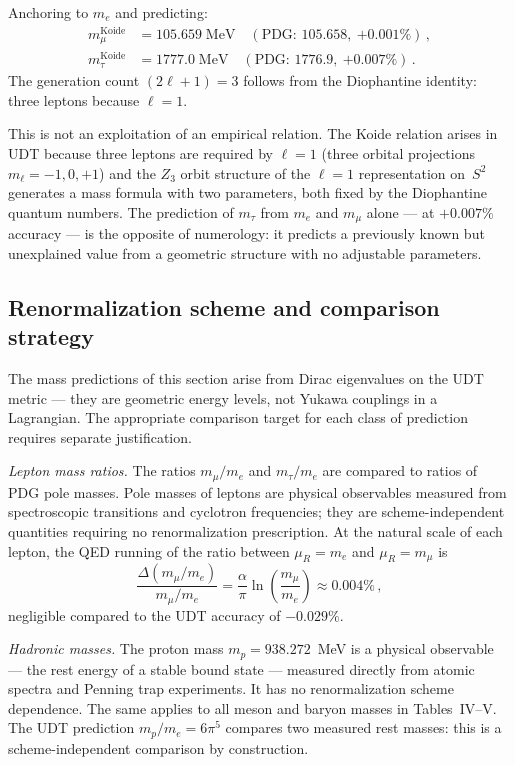 \documentclass[aps,prd,twocolumn,superscriptaddress,nofootinbib,longbibliography]{revtex4-2}
\begin{document}
Anchoring to $m_e$ and predicting:
\begin{align}
  m_\mu^{\mathrm{Koide}} &= 105.659\;\text{MeV}
    \quad(\text{PDG: }105.658,\ {+0.001\%})\,,\\
  m_\tau^{\mathrm{Koide}} &= 1777.0\;\text{MeV}
    \quad(\text{PDG: }1776.9,\ {+0.007\%})\,.
\end{align}
The generation count $(2\ell+1) = 3$ follows from the Diophantine
identity: three leptons because $\ell = 1$.

This is not an exploitation of an empirical relation.  The Koide
relation arises in UDT because three leptons are required by $\ell=1$
(three orbital projections $m_\ell = -1,0,+1$) and the $Z_3$ orbit
structure of the $\ell=1$ representation on~$S^2$ generates a mass
formula with two parameters, both fixed by the Diophantine quantum
numbers.  The prediction of $m_\tau$ from $m_e$ and $m_\mu$ alone ---
at $+0.007\%$ accuracy --- is the opposite of numerology: it predicts
a previously known but unexplained value from a geometric structure
with no adjustable parameters.

\subsection{Renormalization scheme and comparison strategy}

The mass predictions of this section arise from Dirac eigenvalues on
the UDT metric --- they are geometric energy levels, not Yukawa
couplings in a Lagrangian.  The appropriate comparison target for each
class of prediction requires separate justification.

\textit{Lepton mass ratios.}  The ratios $m_\mu/m_e$ and $m_\tau/m_e$
are compared to ratios of PDG pole masses.  Pole masses of leptons are
physical observables measured from spectroscopic transitions and
cyclotron frequencies; they are scheme-independent quantities requiring
no renormalization prescription.  At the natural scale of each lepton,
the QED running of the ratio between $\mu_R = m_e$ and
$\mu_R = m_\mu$ is
\begin{equation}
  \frac{\Delta(m_\mu/m_e)}{m_\mu/m_e}
  = \frac{\alpha}{\pi}\ln\!\left(\frac{m_\mu}{m_e}\right)
  \approx 0.004\%\,,
\end{equation}
negligible compared to the UDT accuracy of $-0.029\%$.

\textit{Hadronic masses.}  The proton mass $m_p = 938.272$~MeV is a
physical observable --- the rest energy of a stable bound state ---
measured directly from atomic spectra and Penning trap experiments.
It has no renormalization scheme dependence.  The same applies to all
meson and baryon masses in Tables~IV--V.  The UDT prediction
$m_p/m_e = 6\pi^5$ compares two measured rest masses: this is a
scheme-independent comparison by construction.
\end{document}
